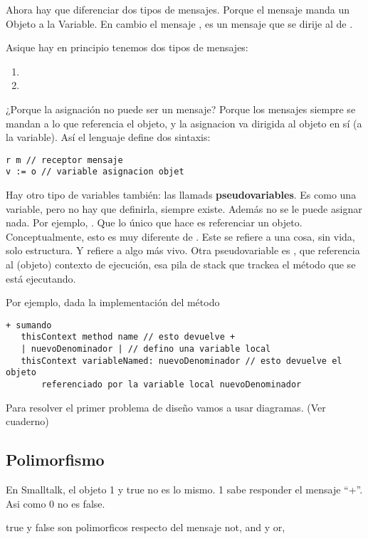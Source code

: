 Ahora hay que diferenciar dos tipos de mensajes. Porque el mensaje \code{:=} manda un Objeto a la Variable. En cambio el mensaje , es un mensaje que se dirije al  de . 

Asique hay en principio tenemos dos tipos de mensajes: 
\begin{enumerate}
 \item {}
 \item {}
\end{enumerate}

¿Porque la asignación no puede ser un mensaje? 
Porque los mensajes siempre se mandan a lo que referencia el objeto, y la asignacion va dirigida al objeto en sí (a la variable). 
Así el lenguaje define dos sintaxis: 
\begin{verbatim}
r m // receptor mensaje
v := o // variable asignacion objet
\end{verbatim}

Hay otro tipo de variables también: las llamads \textbf{pseudovariables}. Es como una variable, pero no hay que definirla, siempre existe. Además no se le puede asignar nada. Por ejemplo, . Que lo único que hace es referenciar un objeto. 
Conceptualmente, esto es muy diferente de . Este se refiere a una cosa, sin vida, solo estructura. Y  refiere a algo más vivo. 
Otra pseudovariable es , que referencia al (objeto) contexto de ejecución, esa pila de stack que trackea el método que se está ejecutando.  

Por ejemplo, dada la implementación del método
\begin{verbatim}
+ sumando
   thisContext method name // esto devuelve +
   | nuevoDenominador | // defino una variable local
   thisContext variableNamed: nuevoDenominador // esto devuelve el objeto 
       referenciado por la variable local nuevoDenominador
\end{verbatim}

Para resolver el primer problema de diseño vamos a usar diagramas. (Ver cuaderno)

\subsection{Polimorfismo}

En Smalltalk, el objeto 1 y true no es lo mismo. 1 sabe responder el mensaje “+”. Asi como 0 no es false. 

true y false son polimorficos respecto del mensaje not, and y or, 

